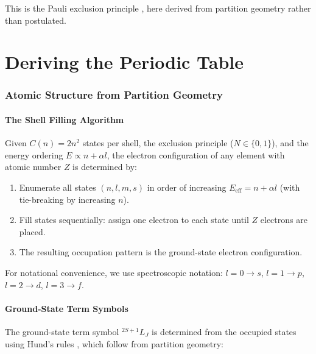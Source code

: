 \documentclass[11pt,a4paper]{article}
\theoremstyle{definition}
\theoremstyle{remark}
\begin{document}
This is the Pauli exclusion principle \citep{pauli1925}, here derived from partition geometry rather than postulated.


\part{Deriving the Periodic Table}

\section{Atomic Structure from Partition Geometry}
\label{sec:atomic_structure}

\subsection{The Shell Filling Algorithm}

Given $C(n) = 2n^2$ states per shell, the exclusion principle ($N \in \{0, 1\}$), and the energy ordering $E \propto n + \alpha l$, the electron configuration of any element with atomic number $Z$ is determined by:

\begin{enumerate}
\item Enumerate all states $(n, l, m, s)$ in order of increasing $E_{\mathrm{eff}} = n + \alpha l$ (with tie-breaking by increasing $n$).
\item Fill states sequentially: assign one electron to each state until $Z$ electrons are placed.
\item The resulting occupation pattern is the ground-state electron configuration.
\end{enumerate}

For notational convenience, we use spectroscopic notation: $l = 0 \to s$, $l = 1 \to p$, $l = 2 \to d$, $l = 3 \to f$.

\subsection{Ground-State Term Symbols}

The ground-state term symbol ${}^{2S+1}L_J$ is determined from the occupied states using Hund's rules \citep{hund1925}, which follow from partition geometry:
\end{document}
